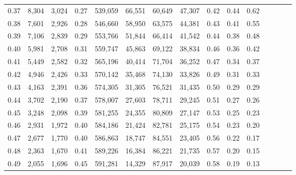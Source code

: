 \begin{tabular}{rrrcrrrrrrrrrrr}
0.37 &   8,304 &  3,024 &                                       0.27 &  539,059 &   66,551 &   60,649 &   47,307 &  0.42 &  0.44 &                         0.62 \\
0.38 &   7,601 &  2,926 &                                       0.28 &  546,660 &   58,950 &   63,575 &   44,381 &  0.43 &  0.41 &                         0.55 \\
0.39 &   7,106 &  2,839 &                                       0.29 &  553,766 &   51,844 &   66,414 &   41,542 &  0.44 &  0.38 &                         0.48 \\
0.40 &   5,981 &  2,708 &                                       0.31 &  559,747 &   45,863 &   69,122 &   38,834 &  0.46 &  0.36 &                         0.42 \\
0.41 &   5,449 &  2,582 &                                       0.32 &  565,196 &   40,414 &   71,704 &   36,252 &  0.47 &  0.34 &                         0.37 \\
0.42 &   4,946 &  2,426 &                                       0.33 &  570,142 &   35,468 &   74,130 &   33,826 &  0.49 &  0.31 &                         0.33 \\
0.43 &   4,163 &  2,391 &                                       0.36 &  574,305 &   31,305 &   76,521 &   31,435 &  0.50 &  0.29 &                         0.29 \\
0.44 &   3,702 &  2,190 &                                       0.37 &  578,007 &   27,603 &   78,711 &   29,245 &  0.51 &  0.27 &                         0.26 \\
0.45 &   3,248 &  2,098 &                                       0.39 &  581,255 &   24,355 &   80,809 &   27,147 &  0.53 &  0.25 &                         0.23 \\
0.46 &   2,931 &  1,972 &                                       0.40 &  584,186 &   21,424 &   82,781 &   25,175 &  0.54 &  0.23 &                         0.20 \\
0.47 &   2,677 &  1,770 &                                       0.40 &  586,863 &   18,747 &   84,551 &   23,405 &  0.56 &  0.22 &                         0.17 \\
0.48 &   2,363 &  1,670 &                                       0.41 &  589,226 &   16,384 &   86,221 &   21,735 &  0.57 &  0.20 &                         0.15 \\
0.49 &   2,055 &  1,696 &                                       0.45 &  591,281 &   14,329 &   87,917 &   20,039 &  0.58 &  0.19 &                         0.13 \\

\end{tabular}
